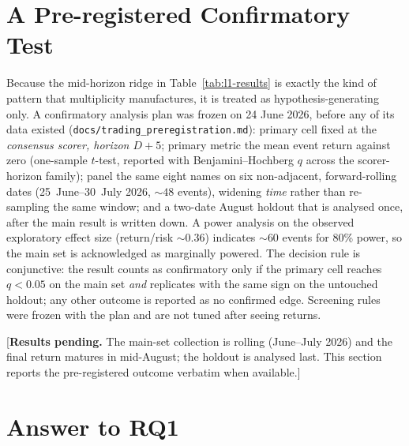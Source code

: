 \section{A Pre-registered Confirmatory Test}
\label{sec:l1-prereg}

Because the mid-horizon ridge in Table~\ref{tab:l1-results} is exactly
the kind of pattern that multiplicity manufactures, it is treated as
hypothesis-generating only. A confirmatory analysis plan was frozen on
24 June 2026, before any of its data existed
(\texttt{docs/trading\_preregistration.md}): primary cell fixed at the
\emph{consensus scorer, horizon $D{+}5$}; primary metric the mean
event return against zero (one-sample $t$-test, reported with
Benjamini--Hochberg $q$ across the scorer-horizon family); panel the
same eight names on six non-adjacent, forward-rolling dates
(25~June--30~July 2026, ${\sim}48$ events), widening \emph{time}
rather than re-sampling the same window; and a two-date August holdout
that is analysed once, after the main result is written down. A power
analysis on the observed exploratory effect size (return/risk
${\sim}0.36$) indicates ${\sim}60$ events for 80\% power, so the main
set is acknowledged as marginally powered. The decision rule is
conjunctive: the result counts as confirmatory only if the primary
cell reaches $q < 0.05$ on the main set \emph{and} replicates with the
same sign on the untouched holdout; any other outcome is reported as
no confirmed edge. Screening rules were frozen with the plan and are
not tuned after seeing returns.

[\textbf{Results pending.} The main-set collection is rolling
(June--July 2026) and the final return matures in mid-August; the
holdout is analysed last. This section reports the pre-registered
outcome verbatim when available.]

\section{Answer to RQ1}
\label{sec:l1-answer}

